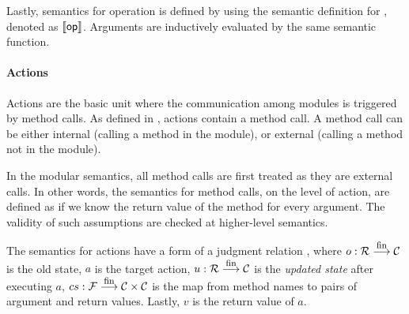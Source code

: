 Lastly, semantics for operation is defined by using the semantic
definition for \seop{}, denoted as $\llbracket \textsf{op}{} \rrbracket$. Arguments are
inductively evaluated by the same semantic function.

\paragraph{Actions}

Actions are the basic unit where the communication among modules is
triggered by method calls. As defined in , actions
contain a method call. A method call can be either internal (calling a
method in the module), or external (calling a method not in the
module).

In the modular semantics, all method calls are first treated as they
are external calls. In other words, the semantics for method calls, on
the level of action, are defined as if we know the return value of the
method for every argument. The validity of such assumptions are
checked at higher-level semantics.

The semantics for actions have a form of a judgment relation
, where $o : \mathcal{R} \stackrel{\textrm{\footnotesize{fin}}}{\longrightarrow} \mathcal{C}{}$ is the old state, $a$
is the target action, $u : \mathcal{R} \stackrel{\textrm{\footnotesize{fin}}}{\longrightarrow} \mathcal{C}{}$ is the \emph{updated state}
after executing $a$, $cs : \mathcal{F} \stackrel{\textrm{\footnotesize{fin}}}{\longrightarrow} \mathcal{C} \times \mathcal{C}{}$ is the map from method names to
pairs of argument and return values. Lastly, $v$ is the return value
of $a$.

